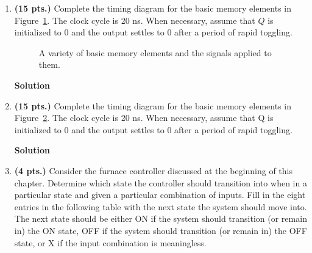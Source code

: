 \begin{enumerate}
    \item \textbf{ (15 pts.)} Complete the timing diagram for the basic memory
        elements in Figure~\ref{fig:sequentialCirExTim}.  The clock cycle is 20 ns. When
        necessary, assume that $Q$ is initialized to 0 and the output settles to
        0 after a period of rapid toggling.

        \begin{figure}[ht]
            \caption{A variety of basic memory elements and the signals applied to them.}
            \label{fig:sequentialCirExTim}
        \end{figure}

        \begin{onlysolution}  \textbf{Solution} \itshape{
                \begin{figure}[ht]
                \end{figure}
            }
        \end{onlysolution}

    \item \textbf{ (15 pts.)} Complete the timing diagram for the basic memory elements in
        Figure~\ref{fig:sequentialCirExTim2}.  The clock cycle is 20 ns. When necessary,
        assume that Q is initialized to 0 and the output settles to 0 after
        a period of rapid toggling.
        \begin{figure}[ht]
            \caption{}
            \label{fig:sequentialCirExTim2}
        \end{figure}

        \begin{onlysolution}  \textbf{Solution} \itshape{
                \begin{figure}[ht]
                \end{figure}
            }
        \end{onlysolution}

    \item \textbf{ (4 pts.)} Consider the furnace
        controller discussed at the beginning of this chapter.  Determine
        which state the controller should transition into when in a particular state
        and given a particular combination of inputs.
        Fill in the eight entries in the following table with the next state
        the system should move into.  The next state should be either ON if the
        system should transition (or remain in) the ON state, OFF if the system
        should transition (or remain in) the OFF state, or X if the input
        combination is meaningless.


\end{enumerate}
